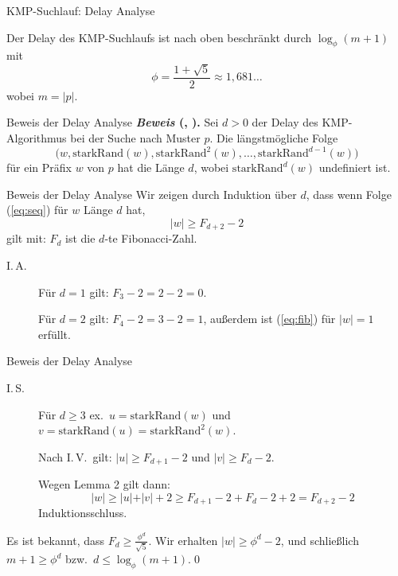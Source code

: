 \documentclass[xcolor=dvipsnames, aspectratio=169]{beamer}
\begin{document}
\begin{frame}{KMP-Suchlauf: Delay Analyse}
\begin{theo}
Der Delay des KMP-Suchlaufs ist nach oben beschränkt durch $\log_\phi(m+1)$ mit \[\phi=\frac{1+\sqrt{5}}{2}\approx 1,681\dots\] wobei $m=\vert p\vert$.
\end{theo}
\end{frame}

\begin{frame}{Beweis der Delay Analyse}
\textbf{\textit{Beweis} (\cite{purdue}, \cite{KnuthMorrisPratt1977}).} Sei $d>0$ der Delay des KMP-Algorithmus bei der Suche nach Muster $p$. Die längstmögliche Folge 
\begin{equation}\label{eq:seq}
\big(w, \mathrm{starkRand}(w), \mathrm{starkRand}^2(w), \dots, \mathrm{starkRand}^{d-1}(w)\big)
\end{equation}
für ein Präfix $w$ von $p$ hat die Länge $d$, wobei $\mathrm{starkRand}^d(w)$ undefiniert ist.
\end{frame}

\begin{frame}{Beweis der Delay Analyse}
Wir zeigen durch Induktion über $d$, dass wenn Folge (\ref{eq:seq}) für $w$ Länge $d$ hat, 
\begin{equation}\label{eq:fib}
\vert w\vert\geq F_{d+2}-2
\end{equation}
gilt mit: $F_{d}$ ist die $d$-te Fibonacci-Zahl.

\begin{description}
\item[I.\,A.] Für $d=1$ gilt: $F_3-2=2-2=0$.

Für $d=2$ gilt: $F_4-2=3-2=1$, außerdem ist (\ref{eq:fib}) für $\vert w\vert=1$ erfüllt.
\end{description}
\end{frame}

\begin{frame}{Beweis der Delay Analyse}
\begin{description}
\item[I.\,S.] Für $d\geq 3$ ex.\ $u=\mathrm{starkRand}(w)$ und $v=\mathrm{starkRand}(u)=\mathrm{starkRand}^2(w)$.\pause

Nach I.\,V.\ gilt: $\vert u\vert\geq F_{d+1}-2$ und $\vert v\vert\geq F_d-2$.

Wegen Lemma 2 gilt dann: \[\vert w\vert\geq \vert u\vert+\vert v\vert+2\geq F_{d+1}-2+F_d-2+2=F_{d+2}-2\]
Induktionsschluss.
\end{description}\medskip\pause

Es ist bekannt, dass $F_d\geq \frac{\phi^d}{\sqrt{5}}$. Wir erhalten $\vert w\vert\geq\phi^d-2$, und schließlich $m+1\geq\phi^d$ bzw.\ $d\leq\log_\phi(m+1)$.\qed 
\end{frame}
\end{document}
